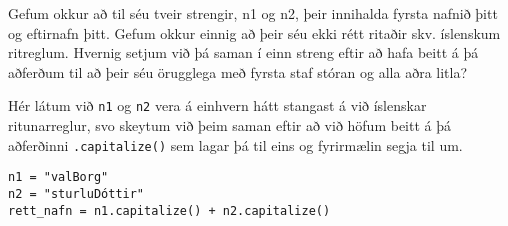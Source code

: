 \begin{exercise}\label{str7}
Gefum okkur að til séu tveir strengir, n1 og n2, þeir innihalda fyrsta nafnið þitt og eftirnafn þitt.
Gefum okkur einnig að þeir séu ekki rétt ritaðir skv. íslenskum ritreglum.
Hvernig setjum við þá saman í einn streng eftir að hafa beitt á þá aðferðum til að þeir séu örugglega með fyrsta staf stóran og alla aðra litla?
\end{exercise}
\begin{Answer}[ref={str7}]
	Hér látum við \texttt{n1} og \texttt{n2} vera á einhvern hátt stangast á við íslenskar ritunarreglur, svo skeytum við þeim saman eftir að við höfum beitt á þá aðferðinni \texttt{.capitalize()} sem lagar þá til eins og fyrirmælin segja til um.
\begin{lstlisting}
n1 = "valBorg"
n2 = "sturluDóttir"
rett_nafn = n1.capitalize() + n2.capitalize()\end{lstlisting}
\end{Answer}

